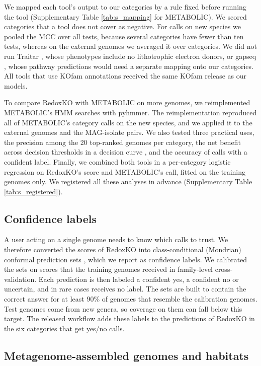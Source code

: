 \documentclass[10pt,a4paper,onecolumn]{article}
\begin{document}
We mapped each tool's output to our categories by a rule fixed before
running the tool (Supplementary Table \ref{tab:s_mapping} for
METABOLIC). We scored categories that a tool does not cover as negative.
For calls on new species we pooled the MCC over all tests, because
several categories have fewer than ten tests, whereas on the external
genomes we averaged it over categories. We did not run Traitar
\autocite{Weimann2016}, whose phenotypes include no lithotrophic
electron donors, or gapseq \autocite{Zimmermann2021}, whose pathway
predictions would need a separate mapping onto our categories. All tools
that use KOfam annotations received the same KOfam release as our
models.

To compare RedoxKO with METABOLIC on more genomes, we reimplemented
METABOLIC's HMM searches with pyhmmer. The reimplementation reproduced
all of METABOLIC's category calls on the new species, and we applied it
to the external genomes and the MAG-isolate pairs. We also tested three
practical uses, the precision among the 20 top-ranked genomes per
category, the net benefit across decision thresholds in a decision curve
\autocite{Vickers2006}, and the accuracy of calls with a confident
label. Finally, we combined both tools in a per-category logistic
regression on RedoxKO's score and METABOLIC's call, fitted on the
training genomes only. We registered all these analyses in advance
(Supplementary Table \ref{tab:s_registered}).

\subsection{Confidence labels}\label{confidence-labels}

A user acting on a single genome needs to know which calls to trust. We
therefore converted the scores of RedoxKO into class-conditional
(Mondrian) conformal prediction sets \autocite{Angelopoulos2023}, which
we report as confidence labels. We calibrated the sets on scores that
the training genomes received in family-level cross-validation. Each
prediction is then labeled a confident yes, a confident no or uncertain,
and in rare cases receives no label. The sets are built to contain the
correct answer for at least 90\% of genomes that resemble the
calibration genomes. Test genomes come from new genera, so coverage on
them can fall below this target. The released workflow adds these labels
to the predictions of RedoxKO in the six categories that get yes/no
calls.

\subsection{Metagenome-assembled genomes and
habitats}\label{metagenome-assembled-genomes-and-habitats}
\end{document}
